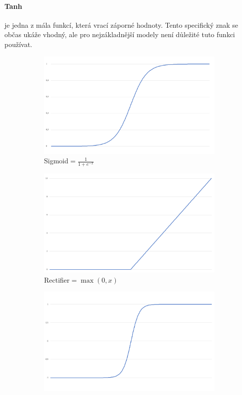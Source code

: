 \documentclass[12pt,a4paper]{report}
\begin{document}
		\paragraph{Tanh}
		je jedna z mála funkcí, která vrací záporné hodnoty. Tento specifický znak se občas ukáže vhodný, ale pro nejzákladnější modely není důležité tuto funkci používat.
		\begin{figure}
			\centering
			\begin{subfigure}[h]{0.3\textwidth}
				\includegraphics[width=\textwidth]{sigmoid}
				\caption{Sigmoid$=\frac{1}{1+e^{-x}}$}
				\label{fig:sigmoid}
			\end{subfigure}
			\begin{subfigure}[h]{0.3\textwidth}
				\includegraphics[width=\textwidth]{rectifier}
				\caption{Rectifier$=\max(0,x)$}
				\label{fig:rectifier}
			\end{subfigure}
			\begin{subfigure}[h]{0.3\textwidth}
				\includegraphics[width=\textwidth]{tanh}

\end{subfigure}
\end{figure}
\end{document}
